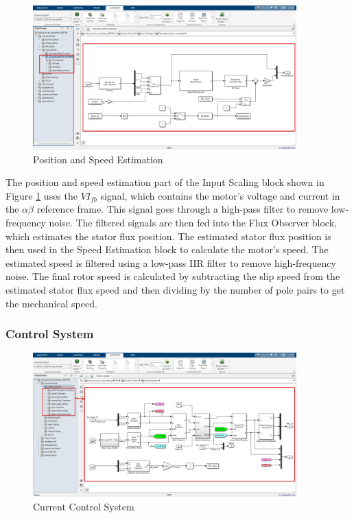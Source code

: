\begin{figure}[H]
	\centering
	\includegraphics[width=4in]{sections/section3/images/simulation/inputScaling/fluxObserver.png}
	\caption{Position and Speed Estimation}
	\label{fig:position_speed_estimation}
\end{figure}


The position and speed estimation part of the Input Scaling block shown in  Figure \ref{fig:position_speed_estimation} uses the $VI_{fb}$ signal, which contains the motor's voltage and current in the $\alpha \beta$ reference frame. This signal goes through a high-pass filter to remove low-frequency noise. The filtered signals are then fed into the Flux Observer block, which estimates the stator flux position. The estimated stator flux position is then used in the Speed Estimation block to calculate the motor's speed. The estimated speed is filtered using a low-pass IIR filter to remove high-frequency noise. The final rotor speed is calculated by subtracting the slip speed from the estimated stator flux speed and then dividing by the number of pole pairs to get the mechanical speed.

\subsubsection{Control System}



\begin{figure}[H]
	\centering
	\includegraphics[width=4in]{sections/section3/images/simulation/currentControl/controlSystem.png}
	\caption{Current Control System}
	\label{fig:current_control_system}
\end{figure}


